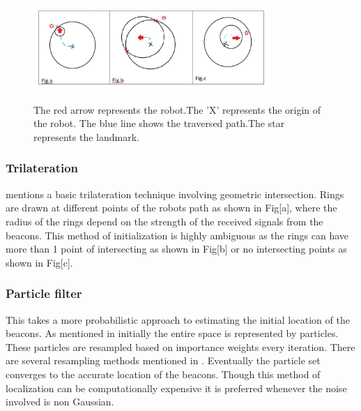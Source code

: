 \documentclass[conference]{IEEEtran}
\begin{document}
		\begin{figure}
			\centering
			\includegraphics[height=40mm,width=90mm]{Trilateration_methods.JPG}
			\caption{The red arrow represents the robot.The 'X' represents the origin of the robot. The blue line shows the traversed path.The star represents the landmark. }
		\end{figure}
	
	\subsubsection{Trilateration}
		\cite{Thrun2002} mentions a basic trilateration technique involving geometric intersection. Rings are drawn at different points of the robots path as shown in Fig[a], where the radius of the rings depend on the strength of the received signals from the beacons. This method of initialization is highly ambiguous as the rings can have more than 1 point of intersecting as shown in Fig[b]  or no  intersecting points as shown in Fig[c]. %

	\subsubsection{Particle filter}
		This takes a more probabilistic approach to estimating the initial location of the beacons. As mentioned in\cite{Thrun2002a} initially the entire space is represented by particles. These particles are resampled based on importance weights every iteration. There are several resampling methods mentioned in \cite{Li2015}. Eventually the particle set converges to the accurate location of the beacons. Though this method of localization can be computationally expensive it is preferred whenever the noise involved is non Gaussian.
\end{document}

